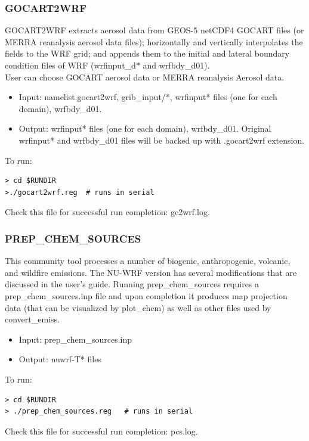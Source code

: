 \begin{frame}[fragile]\frametitle{GOCART2WRF}

\footnotesize{
GOCART2WRF extracts aerosol data from GEOS-5 netCDF4 GOCART files (or MERRA reanalysis aerosol data files); horizontally and vertically interpolates the fields to the WRF grid; and appends them to the initial and lateral boundary condition files of WRF (wrfinput\_d* and wrfbdy\_d01).  \\
User can choose GOCART aerosol data or MERRA reanalysis Aerosol data.  
\begin{itemize}
\item Input: namelist.gocart2wrf, grib\_input/*, wrfinput* files (one for each domain), wrfbdy\_d01.
\item Output: wrfinput* files (one for each domain), wrfbdy\_d01. Original wrfinput* and  wrfbdy\_d01 files will be backed up with .gocart2wrf extension.
\end{itemize}
}    
\hrulefill\par
\footnotesize{To run:}
\begin{lstlisting}
> cd $RUNDIR
>./gocart2wrf.reg  # runs in serial
\end{lstlisting}
Check this file for successful run completion: gc2wrf.log. 


\end{frame}

\begin{frame}[fragile]\frametitle{PREP\_CHEM\_SOURCES}

\footnotesize{
This community tool processes a number of biogenic, anthropogenic, volcanic, and wildfire emissions. The NU-WRF version has several modifications that are discussed in the user's guide. Running prep\_chem\_sources requires a prep\_chem\_sources.inp file and upon completion it produces map projection data (that can be visualized by plot\_chem) as well as other files used by convert\_emiss.
\begin{itemize}
\item Input: prep\_chem\_sources.inp
\item Output: nuwrf-T* files
\end{itemize}
}    
\hrulefill\par
\footnotesize{To run:}
\begin{lstlisting}
> cd $RUNDIR
> ./prep_chem_sources.reg   # runs in serial
\end{lstlisting}
Check this file for successful run completion: pcs.log. 

\end{frame}

